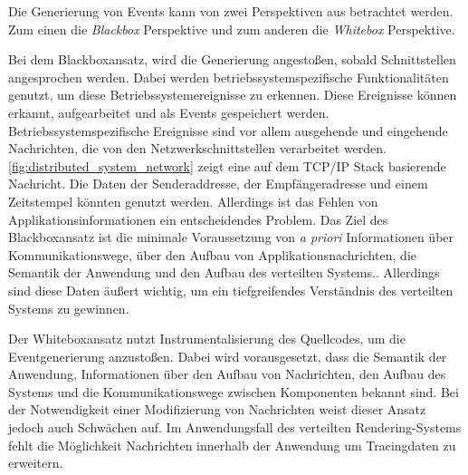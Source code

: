 Die Generierung von Events kann von zwei Perspektiven aus betrachtet werden.
Zum einen die \emph{Blackbox} Perspektive und zum anderen die \emph{Whitebox} Perspektive.

Bei dem Blackboxansatz, wird die Generierung angestoßen, sobald Schnittstellen angesprochen werden. Dabei werden betriebssystemspezifische Funktionalitäten genutzt, um diese Betriebssystemereignisse zu erkennen. Diese Ereignisse können erkannt, aufgearbeitet und als Events gespeichert werden. Betriebssystemspezifische Ereignisse sind vor allem ausgehende und eingehende Nachrichten, die von den Netzwerkschnittstellen verarbeitet werden. \cref{fig:distributed_system_network} zeigt eine auf dem TCP/IP Stack basierende Nachricht. Die Daten der Senderaddresse, der Empfängeradresse und einem Zeitstempel könnten genutzt werden. Allerdings ist das Fehlen von Applikationsinformationen ein entscheidendes Problem. Das Ziel des Blackboxansatz ist die minimale Voraussetzung von \emph{a priori} Informationen über Kommunikationswege, über den Aufbau von Applikationsnachrichten, die Semantik der Anwendung und den Aufbau des verteilten Systems.. Allerdings sind diese Daten äußert wichtig, um ein tiefgreifendes Verständnis des verteilten Systems zu gewinnen. 

Der Whiteboxansatz nutzt Instrumentalisierung des Quellcodes, um die Eventgenerierung anzustoßen. Dabei wird vorausgesetzt, dass die Semantik der Anwendung, Informationen über den Aufbau von Nachrichten, den Aufbau des Systems und die Kommunikationswege zwischen Komponenten bekannt sind. Bei der Notwendigkeit einer Modifizierung von Nachrichten weist dieser Ansatz jedoch auch Schwächen auf. Im Anwendungsfall des verteilten Rendering-Systems fehlt die Möglichkeit Nachrichten innerhalb der Anwendung um Tracingdaten zu erweitern.


